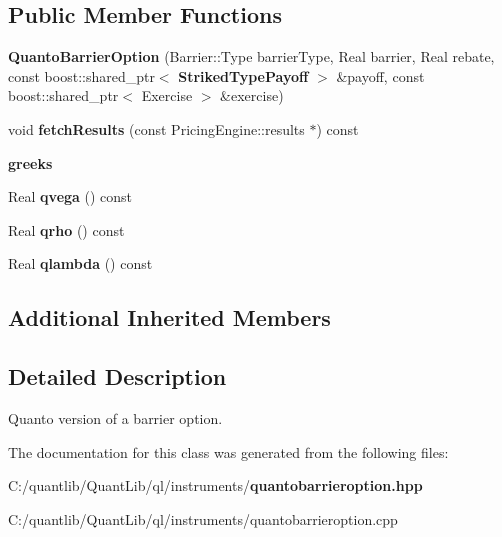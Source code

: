 \subsection*{Public Member Functions}
\begin{DoxyCompactItemize}
\item 
{\bfseries Quanto\+Barrier\+Option} (Barrier\+::\+Type barrier\+Type, Real barrier, Real rebate, const boost\+::shared\+\_\+ptr$<$ {\bf Striked\+Type\+Payoff} $>$ \&payoff, const boost\+::shared\+\_\+ptr$<$ Exercise $>$ \&exercise)\label{class_quant_lib_1_1_quanto_barrier_option_a59828cf1f9976df257b483dd3d911046}

\item 
void {\bfseries fetch\+Results} (const Pricing\+Engine\+::results $\ast$) const \label{class_quant_lib_1_1_quanto_barrier_option_a6e7a53cfceebdbff15cd2b02477a7316}

\end{DoxyCompactItemize}
\begin{Indent}{\bf greeks}\par
\begin{DoxyCompactItemize}
\item 
Real {\bfseries qvega} () const \label{class_quant_lib_1_1_quanto_barrier_option_a6dd20cb47412f68b0977fe3442f855a4}

\item 
Real {\bfseries qrho} () const \label{class_quant_lib_1_1_quanto_barrier_option_a3547ec3a1482d609ef69ba3cf83a6936}

\item 
Real {\bfseries qlambda} () const \label{class_quant_lib_1_1_quanto_barrier_option_a3547c67db9aa0f1e01bf3c6fbbee8739}

\end{DoxyCompactItemize}
\end{Indent}
\subsection*{Additional Inherited Members}


\subsection{Detailed Description}
Quanto version of a barrier option. 



The documentation for this class was generated from the following files\+:\begin{DoxyCompactItemize}
\item 
C\+:/quantlib/\+Quant\+Lib/ql/instruments/{\bf quantobarrieroption.\+hpp}\item 
C\+:/quantlib/\+Quant\+Lib/ql/instruments/quantobarrieroption.\+cpp\end{DoxyCompactItemize}
